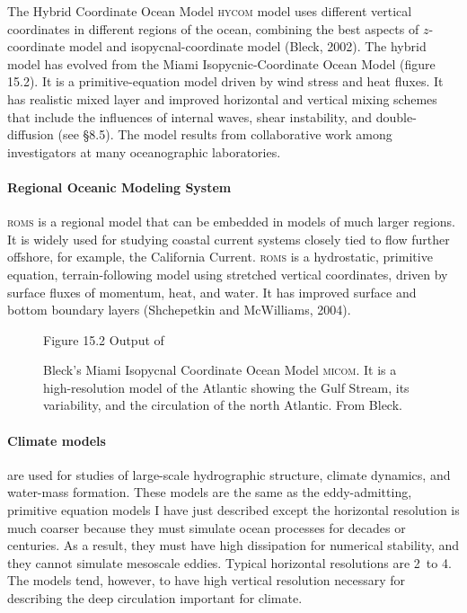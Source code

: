 The Hybrid Coordinate Ocean Model \textsc{hycom} model uses different
vertical coordinates in different regions of the ocean, combining the
best aspects of $z$-coordinate model and isopycnal-coordinate model
(Bleck, 2002). The hybrid model has evolved from the Miami
Isopycnic-Coordinate Ocean Model (figure 15.2). It is a
primitive-equation model driven by wind stress and heat fluxes. It has realistic
mixed layer and improved horizontal and vertical mixing schemes that
include the influences of internal waves, shear instability, and
double-diffusion (see \S 8.5). The model results from collaborative
work among investigators at many oceanographic laboratories.

\paragraph{Regional Oceanic Modeling System}
\textsc{roms} is a regional model that can be embedded in models of
much larger regions. It is widely used for studying coastal current
systems closely tied to flow further offshore, for example, the
California Current. \textsc{roms} is a hydrostatic, primitive
equation, terrain-following model using stretched vertical
coordinates, driven by surface fluxes of momentum, heat, and water. It
has improved surface and bottom boundary layers (Shchepetkin and
McWilliams, 2004).

\begin{figure}[t!]
{} \footnotesize
Figure 15.2 Output of\rule{0mm}{4ex} Bleck's Miami Isopycnal
Coordinate Ocean Model \textsc{micom}. It is a high-resolution model
of the Atlantic showing the Gulf Stream, its variability, and the circulation of
the north Atlantic. From Bleck.
\vspace{-3ex}
\label{fig:blecksgulfstream}
\end{figure}

\paragraph{Climate models}
are used for studies of large-scale hydrographic structure,
climate dynamics, and water-mass formation. These models are the same
as the eddy-admitting, primitive equation models I have just described
except the horizontal resolution is much coarser because they must
simulate ocean processes for decades or centuries. As a result, they
must have high dissipation for numerical stability, and they cannot
simulate mesoscale eddies. Typical horizontal
resolutions are 2\degrees\ to 4\degrees. The models tend, however, to
have high vertical resolution necessary for describing the deep
circulation important for climate.

